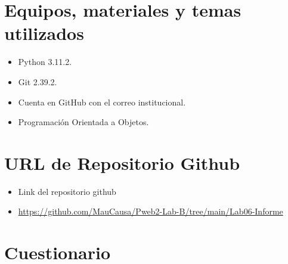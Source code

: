 \documentclass{article}
\begin{document}
	\section{Equipos, materiales y temas utilizados}
	\begin{itemize}
		
		\item Python 3.11.2.
		\item Git 2.39.2.
		\item Cuenta en GitHub con el correo institucional.
		\item Programación Orientada a Objetos.
		
	\end{itemize}
	
	\section{URL de Repositorio Github}
	\begin{itemize}
		
	\end{itemize}
		
	\begin{itemize}	
		\item Link del repositorio github
        \item \url{https://github.com/MauCausa/Pweb2-Lab-B/tree/main/Lab06-Informe}
	\end{itemize}

\section{Cuestionario}
\end{document}
